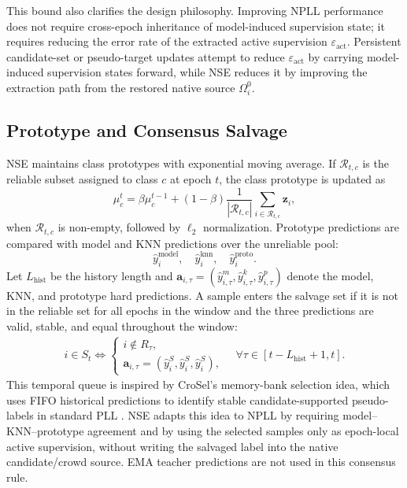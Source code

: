 This bound also clarifies the design philosophy. Improving NPLL performance
does not require cross-epoch inheritance of model-induced supervision state; it
requires reducing the error rate of the extracted active supervision
$\varepsilon_{\mathrm{act}}$. Persistent candidate-set or pseudo-target updates
attempt to reduce $\varepsilon_{\mathrm{act}}$ by carrying model-induced
supervision states forward, while NSE reduces it by improving the extraction
path from the restored native source $\Omega_i^0$.

\subsection{Prototype and Consensus Salvage}
NSE maintains class prototypes with exponential moving average. If
$\mathcal{R}_{t,c}$ is the reliable subset assigned to class $c$ at epoch $t$,
the class prototype is updated as
\begin{equation}
    \mu_c^t
    =
    \beta \mu_c^{t-1}
    +(1-\beta)
    \frac{1}{|\mathcal{R}_{t,c}|}
    \sum_{i\in\mathcal{R}_{t,c}}\mathbf{z}_i,
    \label{eq:proto_ema}
\end{equation}
when $\mathcal{R}_{t,c}$ is non-empty, followed by $\ell_2$ normalization.
Prototype predictions are compared with model and KNN predictions over the
unreliable pool:
\begin{equation}
    \hat{y}^{\mathrm{model}}_i,\quad
    \hat{y}^{\mathrm{knn}}_i,\quad
    \hat{y}^{\mathrm{proto}}_i.
\end{equation}
Let $L_{\mathrm{hist}}$ be the history length and
$\mathbf{a}_{i,\tau}=(\hat{y}^{m}_{i,\tau},\hat{y}^{k}_{i,\tau},\hat{y}^{p}_{i,\tau})$
denote the model, KNN, and prototype hard predictions. A sample enters the
salvage set if it is not in the reliable set for all epochs in the window and
the three predictions are valid, stable, and equal throughout the window:
\begin{equation}
\begin{aligned}
    i\in S_t \Longleftrightarrow
    \begin{cases}
    i\notin R_\tau,\\
    \mathbf{a}_{i,\tau}=(\hat{y}^{S}_{i},\hat{y}^{S}_{i},\hat{y}^{S}_{i}),
    \end{cases}
    \quad
    \forall \tau\in[t-L_{\mathrm{hist}}+1,t].
\end{aligned}
\label{eq:salvage_rule}
\end{equation}
This temporal queue is inspired by CroSel's memory-bank selection idea, which
uses FIFO historical predictions to identify stable candidate-supported
pseudo-labels in standard PLL \cite{tian2024crosel}. NSE adapts this idea to
NPLL by requiring model--KNN--prototype agreement and by using the selected
samples only as epoch-local active supervision, without writing the salvaged
label into the native candidate/crowd source. EMA teacher predictions are not
used in this consensus rule.

